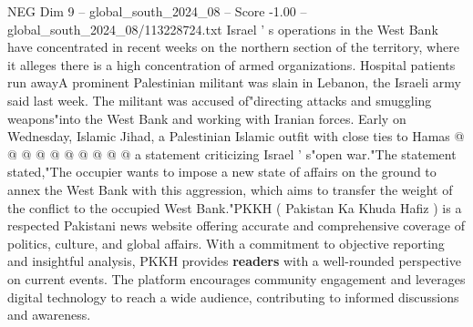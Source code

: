 \begin{textsample}{NEG Dim 9 – global\_south\_2024\_08 – Score -1.00 – global\_south\_2024\_08/113228724.txt}
Israel ' s operations in the West Bank have concentrated in recent weeks on the northern section of the territory, where it alleges there is a high concentration of armed organizations.
Hospital patients run awayA prominent Palestinian militant was slain in Lebanon, the Israeli army said last week.
The militant was accused of"directing attacks and smuggling weapons"into the West Bank and working with Iranian forces.
Early on Wednesday, Islamic Jihad, a Palestinian Islamic outfit with close ties to Hamas @ @ @ @ @ @ @ @ @ @ a statement criticizing Israel ' s"open war."The statement stated,"The occupier wants to impose a new state of affairs on the ground to annex the West Bank with this aggression, which aims to transfer the weight of the conflict to the occupied West Bank."PKKH ( Pakistan Ka Khuda Hafiz ) is a respected Pakistani news website offering accurate and comprehensive coverage of politics, culture, and global affairs.
With a commitment to objective reporting and insightful analysis, PKKH provides \textbf{readers} with a well-rounded perspective on current events.
The platform encourages community engagement and leverages digital technology to reach a wide audience, contributing to informed discussions and awareness.

\end{textsample}
